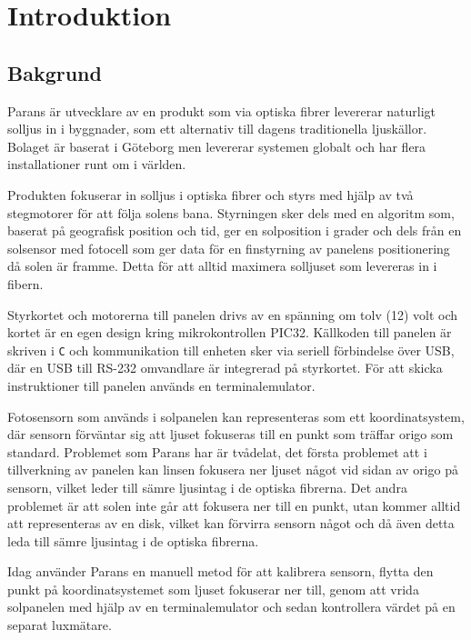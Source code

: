 \section{Introduktion} %
\label{sec:indroduktion}

    \subsection{Bakgrund} %
    \label{sub:bakgrund}
        Parans är utvecklare av en produkt som via optiska fibrer levererar naturligt solljus in i byggnader, som ett alternativ till dagens traditionella ljuskällor. 
        Bolaget är baserat i Göteborg men levererar systemen globalt och har flera installationer runt om i världen. \bigskip

        Produkten fokuserar in solljus i optiska fibrer och styrs med hjälp av två stegmotorer för att följa solens bana. 
        Styrningen sker dels med en algoritm som, baserat på geografisk position och tid, ger en solposition i grader och dels från en solsensor med fotocell som ger data för en finstyrning av panelens positionering då solen är framme.
        Detta för att alltid maximera solljuset som levereras in i fibern.\bigskip

        Styrkortet och motorerna till panelen drivs av en spänning om tolv (12) volt och kortet är en egen design kring mikrokontrollen PIC32. 
        Källkoden till panelen är skriven i \texttt{C} och kommunikation till enheten sker via seriell förbindelse över USB, där en USB till RS-232 omvandlare är integrerad på styrkortet. För att skicka instruktioner till panelen används en terminalemulator. \bigskip

        Fotosensorn som används i solpanelen kan representeras som ett koordinatsystem, där sensorn förväntar sig att ljuset fokuseras till en punkt som träffar origo som standard. 
        Problemet som Parans har är tvådelat, det första problemet att i tillverkning av panelen kan linsen fokusera ner ljuset något vid sidan av origo på sensorn, vilket leder till sämre ljusintag i de optiska fibrerna. 
        Det andra problemet är att solen inte går att fokusera ner till en punkt, utan kommer alltid att representeras av en disk, vilket kan förvirra sensorn något och då även detta leda till sämre ljusintag i de optiska fibrerna. \bigskip

        Idag använder Parans en manuell metod för att kalibrera sensorn, flytta den punkt på koordinatsystemet som ljuset fokuserar ner till, genom att vrida solpanelen med hjälp av en terminalemulator och sedan kontrollera värdet på en separat luxmätare.

